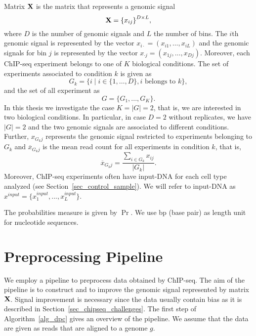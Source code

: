 Matrix $\mathbf{X}$ is the matrix that represents a genomic signal 
$$ \mathbf{X} = {\{{x}_{ij}\}}^{D \times L}, $$  
where $D$ is the number of genomic signals and $L$ the number of bins. 
The $i$th genomic signal is represented by the vector $x_{i\cdot} = (x_{i1}, \ldots, x_{iL})$ and the genomic signals for bin $j$ is represented by the vector $x_{\cdot j} = (x_{1j}, \ldots, x_{Dj})$.
Moreover, each ChIP-seq experiment belongs to one of $K$ biological conditions. 
The set of experiments associated to condition $k$ is given as
$$G_k = \{i \mid i \in \{1, \ldots, D\}, i \text{ belongs to }k\},$$
and the set of all experiment as
$$G=\{G_1,...,G_K\}.$$
\noindent 
In this thesis we investigate the case $K = |G| = 2$, that is, we are interested in two biological conditions.
In particular, in case $D = 2$ without replicates, we have $|G|=2$ and the two genomic signals are associated to different conditions. 
Further, $x_{G_kj}$ represents the genomic signal restricted to experiments belonging to $G_k$ and $\overline{x}_{G_k j}$ is the mean read count for all experiments in condition $k$, that is,
$$\overline{x}_{G_k j} = \frac{\sum_{i \in G_k} x_{ij}}{|G_k|}.$$ 
Moreover, ChIP-seq experiments often have input-DNA for each cell type analyzed (see Section~\ref{sec_control_sample}).
We will refer to input-DNA as  $x^{input}=\{x^{input}_1,...,x^{input}_L\}$. 

The probabilities measure is given by $\Pr$.
We use bp (base pair) as length unit for nucleotide sequences.



\section{Preprocessing Pipeline}
\label{sec_prepocessing_pipeline}
We employ a pipeline to preprocess data obtained by ChIP-seq.
The aim of the pipeline is to construct and to improve the genomic signal represented by matrix $\mathbf{X}$.
Signal improvement is necessary since the data usually contain bias as it is described in Section~\ref{sec_chipseq_challenges}.
The first step of Algorithm~\ref{alg_dpc} gives an overview of the pipeline.
We assume that the data are given as reads that are aligned to a genome $g$.



